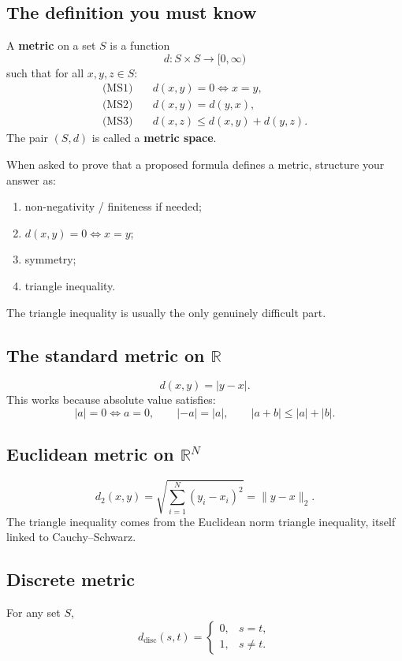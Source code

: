\documentclass[11pt,a4paper]{article}
\newcommand{\R}{\mathbb{R}}
\begin{document}
\subsection{The definition you must know}
\begin{defbox}
A \textbf{metric} on a set $S$ is a function
\[
d:S\times S\to [0,\infty)
\]
such that for all $x,y,z\in S$:
\begin{align*}
\text{(MS1)}\quad & d(x,y)=0 \iff x=y,\\
\text{(MS2)}\quad & d(x,y)=d(y,x),\\
\text{(MS3)}\quad & d(x,z)\le d(x,y)+d(y,z).
\end{align*}
The pair $(S,d)$ is called a \textbf{metric space}.
\end{defbox}

\begin{exambox}
When asked to prove that a proposed formula defines a metric, structure your answer as:
\begin{enumerate}
\item non-negativity / finiteness if needed;
\item $d(x,y)=0\iff x=y$;
\item symmetry;
\item triangle inequality.
\end{enumerate}
The triangle inequality is usually the only genuinely difficult part.
\end{exambox}

\subsection{The standard metric on $\R$}
\[
d(x,y)=|y-x|.
\]
This works because absolute value satisfies:
\[
|a|=0\iff a=0,\qquad |-a|=|a|,\qquad |a+b|\le |a|+|b|.
\]

\subsection{Euclidean metric on $\R^N$}
\[
d_2(x,y)=\sqrt{\sum_{i=1}^N (y_i-x_i)^2}=\|y-x\|_2.
\]
The triangle inequality comes from the Euclidean norm triangle inequality, itself linked to Cauchy--Schwarz.

\subsection{Discrete metric}
For any set $S$,
\[
d_{\mathrm{disc}}(s,t)=
\begin{cases}
0,&s=t,\\
1,&s\ne t.
\end{cases}
\]
\end{document}
